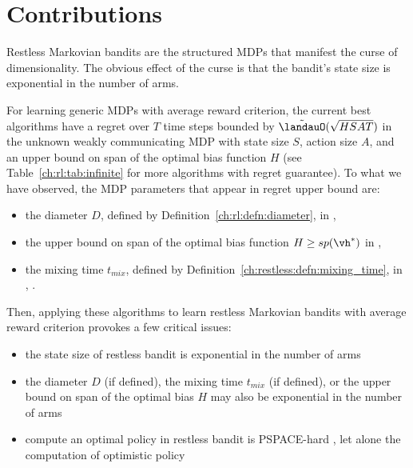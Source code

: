 \section{Contributions}
\label{ch:restless:contribute}

Restless Markovian bandits are the structured MDPs that manifest the curse of dimensionality.
The obvious effect of the curse is that the bandit's state size is exponential in the number of arms.

For learning generic MDPs with average reward criterion, the current best algorithms have a regret over $T$ time steps bounded by $\tilde{\landauO}(\sqrt{HSAT})$ in the unknown weakly communicating MDP with state size $S$, action size $A$, and an upper bound on span of the optimal bias function $H$ (see Table~\ref{ch:rl:tab:infinite} for more algorithms with regret guarantee).
To what we have observed, the MDP parameters that appear in regret upper bound are:
\begin{itemize}
    \item the diameter $D$, defined by Definition~\ref{ch:rl:defn:diameter}, in \eg, \cite{jaksch2010near, fruit2020improved, tossou2019near}
    \item the upper bound on span of the optimal bias function $H\ge sp(\vh^*)$ in \eg, \cite{bartlett2012regal, ouyang2017learning, fruit2018efficient, zhang2019regret}
    \item the mixing time $t_{mix}$, defined by Definition~\ref{ch:restless:defn:mixing_time}, in \eg, \cite{ortner2020regret}.
\end{itemize}
Then, applying these algorithms to learn restless Markovian bandits with average reward criterion provokes a few critical issues:
\begin{itemize}
    \item the state size of restless bandit is exponential in the number of arms
    \item the diameter $D$ (if defined), the mixing time $t_{mix}$ (if defined), or the upper bound on span of the optimal bias $H$ may also be exponential in the number of arms
    \item compute an optimal policy in restless bandit is PSPACE-hard \cite{papadimitriou1994complexity}, let alone the computation of optimistic policy
\end{itemize}
